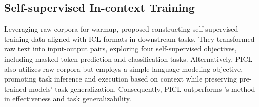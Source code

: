 \subsection{Self-supervised In-context Training}
\label{sec:ss_tuning}
Leveraging raw corpora for warmup, \citet{selfsupericl} proposed constructing self-supervised training data aligned with ICL formats in downstream tasks. They transformed raw text into input-output pairs, exploring four self-supervised objectives, including masked token prediction and classification tasks. Alternatively, PICL~\cite{picl} also utilizes raw corpora but employs a simple language modeling objective, promoting task inference and execution based on context while preserving pre-trained models' task generalization. Consequently, PICL outperforms \citet{selfsupericl}'s method in effectiveness and task generalizability.

 


